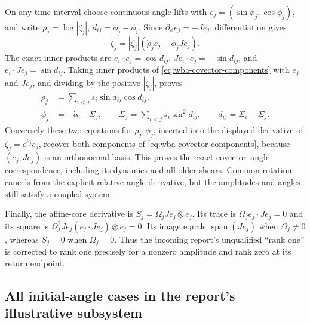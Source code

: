 On any time interval choose continuous angle lifts with
$e_j=(\sin\phi_j,\cos\phi_j)$, and write
$\rho_j=\log|\zeta_j|$, $d_{ij}=\phi_j-\phi_i$.
Since $\partial_\phi e_j=-Je_j$, differentiation gives
\[
 \dot\zeta_j=|\zeta_j|(\dot\rho_j e_j-\dot\phi_j Je_j).
\]
The exact inner products are
$e_i\cdot e_j=\cos d_{ij}$,
$Je_i\cdot e_j=-\sin d_{ij}$, and
$e_i\cdot Je_j=\sin d_{ij}$.
Taking inner products of \eqref{eq:wba-covector-components} with
$e_j$ and $Je_j$, and dividing by the positive $|\zeta_j|$, proves
\begin{align}\label{eq:wba-angle-equations}
 \dot\rho_j&=\sum_{i<j}s_i\sin d_{ij}\cos d_{ij},\\
 \dot\phi_j&=-\dot\alpha-\Sigma_j,
 \qquad\Sigma_j=\sum_{i<j}s_i\sin^2d_{ij},\qquad
 \dot d_{ij}=\Sigma_i-\Sigma_j.
\end{align}
Conversely these two equations for $\rho_j,\phi_j$, inserted into the
displayed derivative of $\zeta_j=e^{\rho_j}e_j$, recover both components
of \eqref{eq:wba-covector-components}, because $(e_j,Je_j)$ is an
orthonormal basis. This proves the exact covector--angle correspondence,
including its dynamics and all older shears. Common rotation cancels
from the explicit relative-angle derivative, but the amplitudes and
angles still satisfy a coupled system.

Finally, the affine-core derivative is
$S_j=\Omega_jJe_j\otimes e_j$. Its trace is
$\Omega_j e_j\cdot Je_j=0$ and its square is
$\Omega_j^2Je_j(e_j\cdot Je_j)\otimes e_j=0$.
Its image equals $\operatorname{span}(Je_j)$ when $\Omega_j\ne0$,
whereas $S_j=0$ when $\Omega_j=0$. Thus the incoming report's
unqualified ``rank one'' is corrected to rank one precisely for a
nonzero amplitude and rank zero at its return endpoint.

\subsection{All initial-angle cases in the report's illustrative subsystem}

